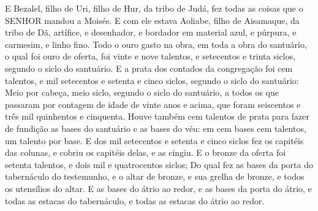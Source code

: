 {  E Bezalel, filho de Uri, filho de Hur, da tribo de Judá, fez todas as coisas que o SENHOR mandou a Moisés.
  E com ele estava Aoliabe, filho de Aisamaque, da tribo de Dã, artífice, e desenhador, e bordador em material azul, e púrpura, e carmesim, e linho fino.
  Todo o ouro gasto na obra, em toda a obra do santuário, o qual foi ouro de oferta, foi vinte e nove talentos, e setecentos e trinta siclos, segundo o siclo do santuário.
  E a prata dos contados da congregação foi cem talentos, e mil setecentos e setenta e cinco siclos, segundo o siclo do santuário: %
  Meio por cabeça, meio siclo, segundo o siclo do santuário, a todos os que passaram por contagem de idade de vinte anos e acima, que foram seiscentos e três mil quinhentos e cinquenta. %
  Houve também cem talentos de prata para fazer de fundição as bases do santuário e as bases do véu: em cem bases cem talentos, um talento por base. %
  E dos mil setecentos e setenta e cinco siclos fez os capitéis das colunas, e cobriu os capitéis delas, e as cingiu. %
  E o bronze da oferta foi setenta talentos, e dois mil e quatrocentos siclos;
  Do qual fez as bases da porta do tabernáculo do testemunho, e o altar de bronze, e sua grelha de bronze, e todos os utensílios do altar.
  E as bases do átrio ao redor, e as bases da porta do átrio, e todas as estacas do tabernáculo, e todas as estacas do átrio ao redor.
\par }

